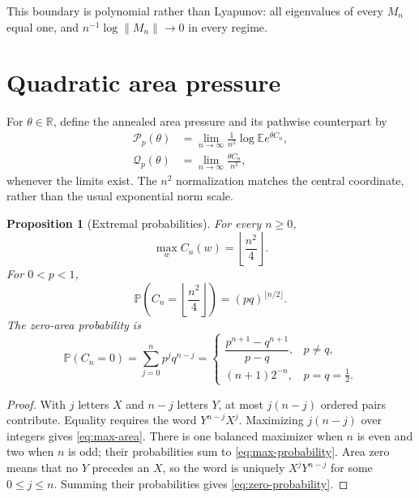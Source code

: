 \documentclass[11pt,a4paper]{amsart}
\newtheorem{proposition}[theorem]{Proposition}
\theoremstyle{definition}
\theoremstyle{remark}
\newcommand{\Prob}{\mathbb P}
\newcommand{\Exp}{\mathbb E}
\newcommand{\R}{\mathbb R}
\newcommand{\norm}[1]{\lVert #1\rVert}
\begin{document}
This boundary is polynomial rather than Lyapunov: all eigenvalues of every
$M_n$ equal one, and $n^{-1}\log\norm{M_n}\to0$ in every regime.

\section{Quadratic area pressure}
\label{sec:pressure}

For $\theta\in\R$, define the annealed area pressure and its pathwise
counterpart by
\begin{align}
 \mathcal P_p(\theta)
 &=\lim_{n\to\infty}\frac1{n^2}
   \log\Exp e^{\theta C_n},\label{eq:annealed-pressure}\\
 \mathcal Q_p(\theta)
 &=\lim_{n\to\infty}\frac{\theta C_n}{n^2},
 \label{eq:typical-pressure}
\end{align}
whenever the limits exist.  The $n^2$ normalization matches the central
coordinate, rather than the usual exponential norm scale.

\begin{proposition}[Extremal probabilities]
\label{prop:extrema}
For every $n\geq0$,
\begin{equation}\label{eq:max-area}
 \max_w C_n(w)=\left\lfloor\frac{n^2}{4}\right\rfloor.
\end{equation}
For $0<p<1$,
\begin{equation}\label{eq:max-probability}
 \Prob\left(C_n=\left\lfloor\frac{n^2}{4}\right\rfloor\right)
 =(pq)^{\lfloor n/2\rfloor}.
\end{equation}
The zero-area probability is
\begin{equation}\label{eq:zero-probability}
 \Prob(C_n=0)=\sum_{j=0}^n p^jq^{n-j}
 =\begin{cases}
 \dfrac{p^{n+1}-q^{n+1}}{p-q},&p\neq q,\\[6pt]
 (n+1)2^{-n},&p=q=\frac12.
 \end{cases}
\end{equation}
\end{proposition}

\begin{proof}
With $j$ letters $X$ and $n-j$ letters $Y$, at most $j(n-j)$ ordered
pairs contribute.  Equality requires the word $Y^{n-j}X^j$.  Maximizing
$j(n-j)$ over integers gives \eqref{eq:max-area}.  There is one balanced
maximizer when $n$ is even and two when $n$ is odd; their probabilities
sum to \eqref{eq:max-probability}.  Area zero means that no $Y$ precedes an
$X$, so the word is uniquely $X^jY^{n-j}$ for some $0\leq j\leq n$.
Summing their probabilities gives \eqref{eq:zero-probability}.
\end{proof}
\end{document}
